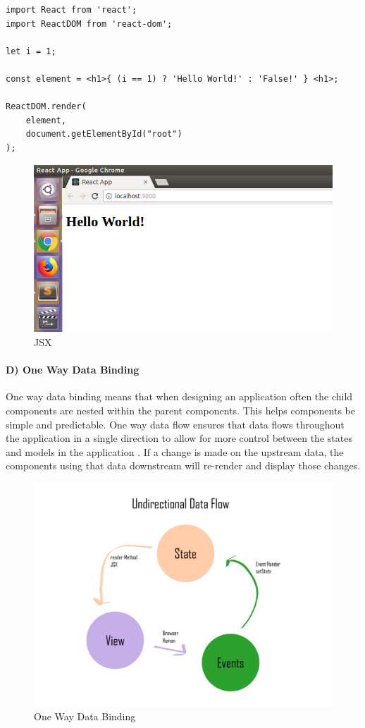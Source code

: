 \begin{verbatim}
import React from 'react';
import ReactDOM from 'react-dom';
 
let i = 1;
 
const element = <h1>{ (i == 1) ? 'Hello World!' : 'False!' } <h1>;
  
ReactDOM.render(
    element,
    document.getElementById("root")
);

\end{verbatim}
\begin{figure}[h]
\centering
\includegraphics[scale=0.3]{img/JSX.png}
\caption{JSX}
\label{JSX}
\end{figure}

\paragraph{D) One Way Data Binding}
One way data binding means that when designing an application often the child components are nested within the parent components. This helps components be simple and predictable. One way data flow ensures that data flows throughout the application in a single direction to allow for more control between the states and models in the application \cite{laydeveloping}. If a change is made on the upstream data, the components using that data downstream will re-render and display those changes.  

\begin{figure}[h]
\centering
\includegraphics[scale=0.3]{img/OneWayDataFlow.png}
\caption{One Way Data Binding}
\label{OneWayDataFlow}
\end{figure}
\newpage

